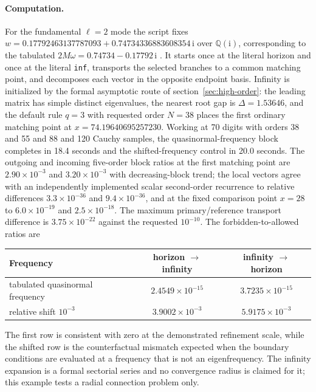 \documentclass[11pt,a4paper]{article}
\newcommand{\ii}{\mathrm i}
\begin{document}
\paragraph{Computation.}
For the fundamental $\ell=2$ mode the script fixes
$w=0.17792463137787093+0.74734336883608354\,\ii$ over $\mathbb Q(\ii)$, corresponding to
the tabulated $2M\omega=0.74734-0.17792\,\ii$ \cite{Leaver:1985ax,Berti:2009kk}. It starts
once at the literal horizon and once at the literal \texttt{inf}, transports the selected
branches to a common matching point, and decomposes each vector in the opposite endpoint
basis. Infinity is initialized by the formal asymptotic route of
section~\ref{sec:high-order}: the leading matrix has simple distinct eigenvalues, the
nearest root gap is $\Delta=1.53646$, and the default rule $q=3$ with requested order
$N=38$ places the first ordinary matching point at
$x=74.19640695257230$. Working at 70 digits with orders 38 and 55 and 88 and 120 Cauchy
samples, the quasinormal-frequency block completes in 18.4 seconds and the
shifted-frequency control in 20.0 seconds. The outgoing and incoming
five-order block ratios at the first matching point are $2.90\times10^{-3}$ and
$3.20\times10^{-3}$ with decreasing-block trend; the local vectors agree with an
independently implemented scalar second-order recurrence to relative differences
$3.3\times10^{-36}$ and $9.4\times10^{-36}$, and at the fixed comparison point $x=28$ to
$6.0\times10^{-19}$ and $2.5\times10^{-18}$. The maximum primary/reference transport
difference is $3.75\times10^{-22}$ against the requested $10^{-10}$. The
forbidden-to-allowed ratios are
\begin{center}
\begin{tabular}{lcc}
\toprule
Frequency & horizon $\to$ infinity & infinity $\to$ horizon\\
\midrule
tabulated quasinormal frequency & $2.4549\times10^{-15}$ & $3.7235\times10^{-15}$\\
relative shift $10^{-3}$ & $3.9002\times10^{-3}$ & $5.9175\times10^{-3}$\\
\bottomrule
\end{tabular}
\end{center}
The first row is consistent with zero at the demonstrated refinement scale, while the
shifted row is the counterfactual mismatch expected when the boundary conditions are
evaluated at a frequency that is not an eigenfrequency. The infinity expansion is a
formal sectorial series and no convergence radius is claimed for it; this example tests a
radial connection problem only.
\end{document}
